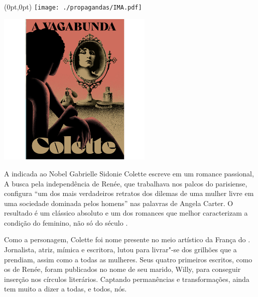 \pagestyle{ima}
\label{ima}

\begin{textblock*}{5.625in}(0pt,0pt)%
\vspace*{-3.5cm}
\hspace*{-2.77cm}\texttt{[image: ./propagandas/IMA.pdf]}
\end{textblock*}

\pagebreak %

\begin{center}
\hspace*{-3.6cm}
\hspace*{3.1cm}\includegraphics[width=74mm]{./grid/vagabond.jpg}
\end{center}

\hspace*{-7cm}\hrulefill\hspace*{-7cm}

\medskip

\noindent{}A indicada ao Nobel Gabrielle Sidonie Colette escreve em {} um romance passional,  A busca pela independência de Renée, que trabalhava nos palcos do {} parisiense, configura “um dos mais verdadeiros retratos dos dilemas de uma mulher livre em uma sociedade dominada pelos homens” nas palavras de Angela Carter. O resultado é um clássico absoluto e um dos romances que melhor caracterizam a condição do feminino, não só do século .

Como a personagem, Colette foi nome presente no meio artístico da França do . Jornalista, atriz, mímica e escritora, lutou para livrar"-se dos grilhões que a prendiam, assim como a todas as mulheres. Seus quatro primeiros escritos, como os de Renée, foram publicados no nome de seu marido, Willy, para conseguir inserção nos círculos literários. Captando permanências e transformações, {} ainda tem muito a dizer a todas, e todos, nós.

